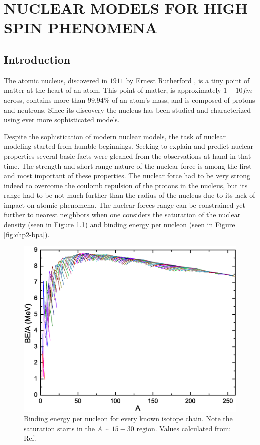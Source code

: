 %
%

\chapter{NUCLEAR MODELS FOR HIGH SPIN PHENOMENA}
\label{chp:models}

\section{Introduction}
\label{sec:models-into}
The atomic nucleus, discovered in $1911$ by Ernest Rutherford \cite{rutherfordNuclearModel}, is a tiny point of matter at the heart of an atom. This point of matter, is approximately $1-10fm$ across, contains more than $99.94\%$ of an atom's mass, and is composed of protons and neutrons. Since its discovery the nucleus has been studied and characterized using ever more sophisticated models.

Despite the sophistication of modern nuclear models, the task of nuclear modeling started from humble beginnings. Seeking to explain and predict nuclear properties several basic facts were gleaned from the observations at hand in that time. The strength and short range nature of the nuclear force is among the first and most important of these properties. The nuclear force had to be very strong indeed to overcome the coulomb repulsion of the protons in the nucleus, but its range had to be not much further than the radius of the nucleus due to its lack of impact on atomic phenomena. The nuclear forces range can be constrained yet further to nearest neighbors when one considers the saturation of the nuclear density (seen in Figure \ref{fig:chp2-density}) and binding energy per nucleon (seen in Figure \ref{fig:chp2-bpa}).

\begin{figure}
\label{fig:chp2-density}
\centerline{\includegraphics[width=\textwidth]{./img/c2/binding_plot.eps}}
	\caption{Binding energy per nucleon for every known isotope chain. Note the saturation starts in the $A\sim15-30$ region. Values calculated from: Ref. \cite{AME20031,AME20032}}
\end{figure}


